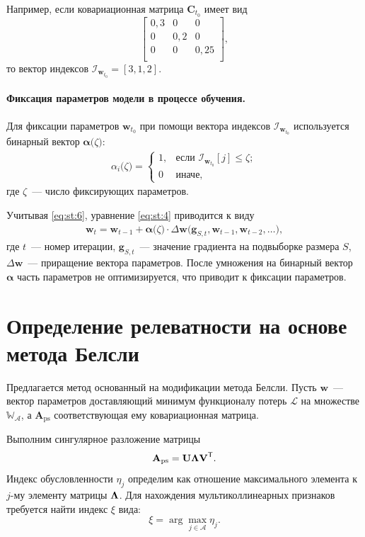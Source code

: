 Например, если ковариационная матрица $\textbf{C}_{t_0}$  имеет вид
 $$
\begin{bmatrix}
0{,}3& 0 & 0\\
0& 0{,}2 & 0\\
0& 0 & 0{,}25\\
\end{bmatrix},
 $$
 то вектор индексов $\mathcal{I}_{\textbf{w}_{t_0}} = [3,1,2]$.
 
\paragraph{Фиксация параметров модели в процессе обучения.}
Для фиксации параметров $\textbf{w}_{t_0}$ при помощи вектора индексов $\mathcal{I}_{\textbf{w}_{t_0}}$ используется бинарный вектор $\bm{\alpha}\bigr(\zeta\bigr)$:
\[
\label{eq:st:6}
\begin{aligned}
\alpha_i\bigr(\zeta\bigr) = \begin{cases}
   1, &\text{если }\mathcal{I}_{\textbf{w}_{t_0}}[j] \leq \zeta;\\
   0 &\text{иначе},
 \end{cases}
\end{aligned}
\]
 где $\zeta$~--- число фиксирующих параметров.
 
 Учитывая \eqref{eq:st:6}, уравнение \eqref{eq:st:4} приводится к виду
 \[
\label{eq:st:7}
\begin{aligned}
\textbf{w}_{t} = \textbf{w}_{t-1} + \bm{\alpha}\bigr(\zeta\bigr)\cdot\Delta\textbf{w}\bigr(\textbf{g}_{S,t}, \textbf{w}_{t-1}, \textbf{w}_{t-2}, \ldots\bigr),
\end{aligned}
\]
где $t$~--- номер итерации, $\textbf{g}_{S,t}$~--- значение градиента на подвыборке размера $S$, $\Delta\textbf{w}$~--- приращение вектора параметров. После умножения на бинарный вектор $\bm\alpha$ часть параметров не оптимизируется, что приводит к фиксации параметров.

\section{Определение релеватности на основе метода Белсли}
Предлагается метод основанный на модификации метода Белсли. Пусть $\textbf{w}$~--- вектор параметров доставляющий минимум функционалу потерь $\mathcal{L}$ на  множестве $\mathbb{W_\mathcal{A}}$, а $\textbf{A}_\text{ps}$ соответствующая ему ковариационная матрица.

Выполним сингулярное разложение матрицы
\[
\label{4.1}
\textbf{A}_\text{ps} = \textbf{U}{\bf\Lambda}\textbf{V}^\mathsf{T}.
\]
Индекс обусловленности $\eta_{j}$ определим как отношение максимального элемента к $j$-му элементу матрицы ${\bf\Lambda}$. Для нахождения мультиколлинеарных признаков требуется найти индекс $\xi$ вида:
\[
\label{4.2}
\xi = \arg\max_{j\in \mathcal{A}}{\eta_j}.
\]


